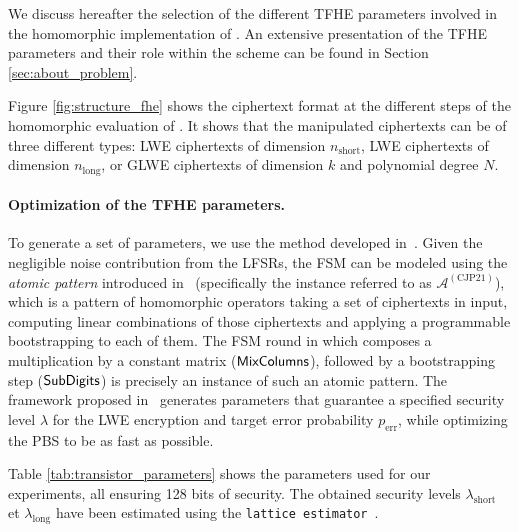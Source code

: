 We discuss hereafter the selection of the different \gls{TFHE} parameters involved in the homomorphic implementation of \coolName. An extensive presentation of the \gls{TFHE} parameters and their role within the scheme can be found in Section \ref{sec:about_problem}.

Figure \ref{fig:structure_fhe} shows the ciphertext format at the different steps of the homomorphic evaluation of \coolName. It shows that the manipulated ciphertexts can be of three different types: LWE ciphertexts of dimension $n_{\text{short}}$, LWE ciphertexts of dimension $n_{\text{long}}$, or GLWE ciphertexts of dimension $k$ and polynomial degree $N$.
	




\paragraph{Optimization of the \gls{TFHE} parameters.}
To generate a set of parameters, we use the method developed in~\cite{JC:BBBCLO23}. Given the negligible noise contribution from the LFSRs, the FSM can be modeled using the \emph{atomic pattern} introduced in~\cite{JC:BBBCLO23} (specifically the instance referred to as $\mathcal{A}^{(\text{CJP21})}$), which is a pattern of homomorphic operators taking a set of ciphertexts in input, computing linear combinations of those ciphertexts and applying a programmable bootstrapping to each of them. The FSM round in \coolName which composes a multiplication by a constant matrix ($\text{\textsf{MixColumns}}$), followed by a bootstrapping step ($\text{\textsf{SubDigits}}$) is precisely an instance of such an atomic pattern. The framework proposed in~\cite{JC:BBBCLO23} generates parameters that guarantee a specified security level $\lambda$ for the LWE encryption and target error probability $p_{\text{err}}$, while optimizing the \gls{PBS} to be as fast as possible. 

Table \ref{tab:transistor_parameters} shows the parameters used for our experiments, all ensuring 128 bits of security. The obtained security levels $\lambda_{\text{short}}$ et $\lambda_{\text{long}}$ have been estimated using the \texttt{lattice estimator}~\cite{lattice-estimator}.

